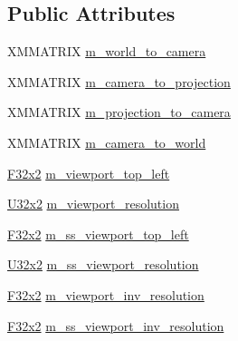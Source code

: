 \subsection*{Public Attributes}
\begin{DoxyCompactItemize}
\item 
X\+M\+M\+A\+T\+R\+IX \mbox{\hyperlink{structmage_1_1rendering_1_1_camera_buffer_af1ceff883dcc383ce10f2165a5a9a061}{m\+\_\+world\+\_\+to\+\_\+camera}}
\item 
X\+M\+M\+A\+T\+R\+IX \mbox{\hyperlink{structmage_1_1rendering_1_1_camera_buffer_a75669aa0916514b1d414e5a2f7c72c75}{m\+\_\+camera\+\_\+to\+\_\+projection}}
\item 
X\+M\+M\+A\+T\+R\+IX \mbox{\hyperlink{structmage_1_1rendering_1_1_camera_buffer_a9cb9e0e4005d55b72668bbdcf4a27218}{m\+\_\+projection\+\_\+to\+\_\+camera}}
\item 
X\+M\+M\+A\+T\+R\+IX \mbox{\hyperlink{structmage_1_1rendering_1_1_camera_buffer_a0633cfc689f2a097783ecc1626b94590}{m\+\_\+camera\+\_\+to\+\_\+world}}
\item 
\mbox{\hyperlink{namespacemage_a9dc0d34d6ecc87e4cfa4a826102117bc}{F32x2}} \mbox{\hyperlink{structmage_1_1rendering_1_1_camera_buffer_a074146702a680ce9102dd9cf84e74be3}{m\+\_\+viewport\+\_\+top\+\_\+left}}
\item 
\mbox{\hyperlink{namespacemage_a31f2bb52b5080e706e1c13de07c0a249}{U32x2}} \mbox{\hyperlink{structmage_1_1rendering_1_1_camera_buffer_a433bdb3d8b4e86fcd04fdb2b794bd0f7}{m\+\_\+viewport\+\_\+resolution}}
\item 
\mbox{\hyperlink{namespacemage_a9dc0d34d6ecc87e4cfa4a826102117bc}{F32x2}} \mbox{\hyperlink{structmage_1_1rendering_1_1_camera_buffer_a7410f2408daa4e4a69e145eb8d31a2d7}{m\+\_\+ss\+\_\+viewport\+\_\+top\+\_\+left}}
\item 
\mbox{\hyperlink{namespacemage_a31f2bb52b5080e706e1c13de07c0a249}{U32x2}} \mbox{\hyperlink{structmage_1_1rendering_1_1_camera_buffer_a96b17352187228ee2265be33d3f2d159}{m\+\_\+ss\+\_\+viewport\+\_\+resolution}}
\item 
\mbox{\hyperlink{namespacemage_a9dc0d34d6ecc87e4cfa4a826102117bc}{F32x2}} \mbox{\hyperlink{structmage_1_1rendering_1_1_camera_buffer_a6ba4a1f638f1ace9021b75773265b8a3}{m\+\_\+viewport\+\_\+inv\+\_\+resolution}}
\item 
\mbox{\hyperlink{namespacemage_a9dc0d34d6ecc87e4cfa4a826102117bc}{F32x2}} \mbox{\hyperlink{structmage_1_1rendering_1_1_camera_buffer_a4695806d4ea3e7af5beeba043f7e9212}{m\+\_\+ss\+\_\+viewport\+\_\+inv\+\_\+resolution}}
\item 

\end{DoxyCompactItemize}
